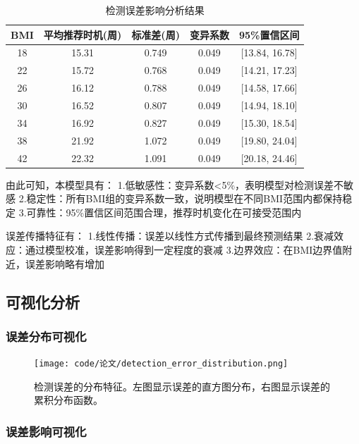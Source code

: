 \documentclass[12pt,a4paper]{ctexart}
\numberwithin{equation}{section}
\theoremstyle{mcm}
\begin{document}
\begin{table}[H]
\centering
\caption{检测误差影响分析结果}
\begin{tabular}{@{}ccccc@{}}
\toprule
BMI & 平均推荐时机(周) & 标准差(周) & 变异系数 & 95\%置信区间 \\
\midrule
18  & 15.31          & 0.749     & 0.049    & [13.84, 16.78] \\
22  & 15.72          & 0.768     & 0.049    & [14.21, 17.23] \\
26  & 16.12          & 0.788     & 0.049    & [14.58, 17.66] \\
30  & 16.52          & 0.807     & 0.049    & [14.94, 18.10] \\
34  & 16.92          & 0.827     & 0.049    & [15.30, 18.54] \\
38  & 21.92          & 1.072     & 0.049    & [19.80, 24.04] \\
42  & 22.32          & 1.091     & 0.049    & [20.18, 24.46] \\
\bottomrule
\end{tabular}
\end{table}

由此可知，本模型具有：
    1.低敏感性：变异系数<5\%，表明模型对检测误差不敏感
    2.稳定性：所有BMI组的变异系数一致，说明模型在不同BMI范围内都保持稳定
    3.可靠性：95\%置信区间范围合理，推荐时机变化在可接受范围内


误差传播特征有：
    1.线性传播：误差以线性方式传播到最终预测结果
    2.衰减效应：通过模型校准，误差影响得到一定程度的衰减
    3.边界效应：在BMI边界值附近，误差影响略有增加


\subsection{可视化分析}

\subsubsection{误差分布可视化}

\begin{figure}[H]
\centering
\texttt{[image: code/论文/detection\_error\_distribution.png]}
\caption{检测误差的分布特征。左图显示误差的直方图分布，右图显示误差的累积分布函数。}
\label{fig:error_distribution}
\end{figure}

\subsubsection{误差影响可视化}
\end{document}
